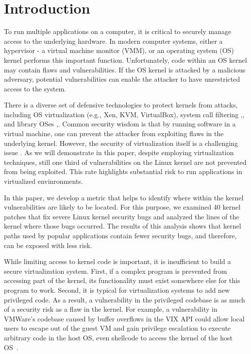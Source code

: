 \section{Introduction}
\label{sec.introduction}

To run multiple applications on a computer, it is critical to securely
manage access to the underlying hardware. In modern computer systems,
either a hypervisor - a virtual machine monitor (VMM), or an 
operating system (OS) kernel performs this important function. Unfortunately, code within an OS kernel may contain flaws and vulnerabilities. If the OS kernel is attacked by a malicious adversary, potential vulnerabilities can enable the attacker to have unrestricted access to the system.




There is a diverse set of defensive technologies to protect kernels from 
attacks, including OS virtualization (e.g., Xen, KVM, VirtualBox), system call filtering \cite{Janus:99},\cite{SCI-04}, and library OSes \cite{Bascule},\cite{Drawbridge-11}. Common security wisdom is that by running software in a virtual machine, one can prevent the attacker from exploiting flaws in the underlying kernel. However, the security of virtualization itself is a  challenging issue \cite{Tal}. As we will demonstrate in this paper, despite employing virtualization techniques, still one third of vulnerabilities on the Linux kernel are not prevented from being exploited. This rate highlights substantial risk to run applications in virtualized envinronments.

In this paper, we develop a metric that helps to identify where
within the kernel vulnerabilities are likely to be located. For this purpose, we
examined 40 kernel patches that fix severe Linux kernel security bugs
and analyzed the lines of the kernel where those bugs occurred. The results of this analysis shows that kernel paths used by popular applications contain fewer
security bugs, and therefore, can be exposed with less risk. 

While limiting access to kernel code is important, it is
insufficient to build a secure virtualization system.  First, if a complex
program is prevented from accessing part of the kernel, its functionality 
must exist somewhere else for this program to work.  Second, it is 
typical for virtualization systems to add new privileged code.
As a result, a vulnerability in the privileged codebase is as much of a security 
risk as a flaw in the kernel.  %
For example, a vulnerability in VMWare's codebase caused by buffer overflows in the VIX
API could allow local users to escape out of the guest VM and 
gain privilege escalation to execute arbitrary code in the host
OS, even shellcode to access the kernel of the host OS~\cite{CVE-2008-2100}.  

